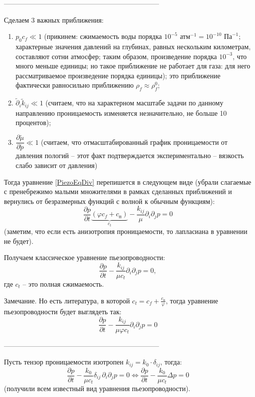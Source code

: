 \documentclass[a4paper,12pt]{article}
\newcommand{\beq}{\begin{equation}}
\newcommand{\eeq}{\end{equation}}
\begin{document}
--------------------------------------------------------------------

Сделаем 3 важных приближения:
\begin{enumerate}
	\item $p_0 c_f\ll 1$ (прикинем: сжимаемость воды порядка $10^{-5}\text{ атм}^{-1}=10^{-10}\text{ Па}^{-1}$; характерные значения давлений на глубинах, равных нескольким километрам, составляют сотни атмосфер; таким образом, произведение порядка $10^{-3}$, что много меньше единицы; но такое приближение не работает для газа: для него рассматриваемое произведение порядка единицы); это приближение фактически равносильно приближению $\rho_f\approx\rho_f^0$;
	\item $\tilde{\partial}_i\tilde{k}_{ij}\ll 1$ (считаем, что на характерном масштабе задачи по данному направлению проницаемость изменяется незначительно, не больше 10 процентов);
	\item $\dfrac{\partial\tilde{\mu}}{\partial\tilde{p}}\ll 1$ (считаем, что отмасштабированный график проницаемости от давления пологий -- этот факт подтверждается экспериментально -- вязкость слабо зависит от давления)
\end{enumerate}

Тогда уравнение \eqref{PiezoEqDiv} перепишется в следующем виде (убрали слагаемые с пренебрежимо малыми множителями в рамках сделанных приближений и вернулись от безразмерных функций с волной к обычным функциям):
\beq
\frac{\partial p}{\partial t}\underbrace{\left(\varphi c_f+c_\text{п}\right)}_{c_t}-\frac{k_{ij}}{\mu}\partial_i\partial_j p=0
\eeq
(заметим, что если есть анизотропия проницаемости, то лапласиана в уравнении не будет).

Получаем классическое уравнение пьезопроводности:
\beq
\frac{\partial p}{\partial t}-\frac{k_{ij}}{\mu c_t}\partial_i\partial_j p=0,
\eeq
где $c_t$ -- это полная сжимаемость.

Замечание. Но есть литература, в которой $c_t=c_f+\frac{c_\text{п}}{\varphi}$, тогда уравнение пьезопроводности будет выглядеть так:
\beq
\frac{\partial p}{\partial t}-\frac{k_{ij}}{\mu\varphi c_t}\partial_i\partial_j p=0
\eeq

--------------------------------------------------------------------

Пусть тензор проницаемости изотропен $k_{ij}=k_0\cdot\delta_{ij}$, тогда:
\beq
\frac{\partial p}{\partial t}-\frac{k_0}{\mu c_t}\delta_{ij}\,\partial_i\partial_j p=0\Leftrightarrow\frac{\partial p}{\partial t}-\frac{k_0}{\mu c_t}\Delta p=0
\eeq
(получили всем известный вид уравнения пьезопроводности).
\end{document}
